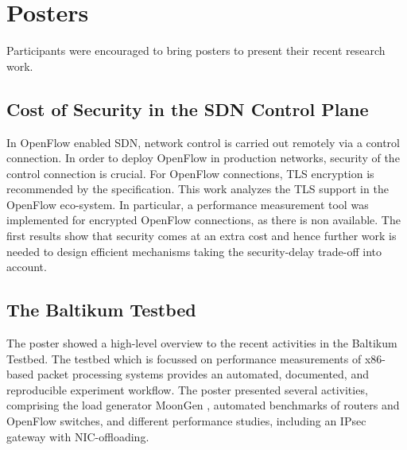 \section{Posters}\label{sec:posters}

Participants were encouraged to bring posters to present
their recent research work.

\subsection{Cost of Security in the SDN Control Plane}

In OpenFlow enabled \ac{SDN}, network control is carried out remotely via a
control connection. In order to deploy OpenFlow in production networks,
security of the control connection is crucial. For OpenFlow connections, TLS
encryption is recommended by the specification. This work
\cite{wkellerer:conext:2015} analyzes the TLS support in the OpenFlow
eco-system. In particular, a performance measurement tool was implemented for
encrypted OpenFlow connections, as there is non available. The first results
show that security comes at an extra cost and hence further work is needed to
design efficient mechanisms taking the security-delay trade-off into account.


\subsection{The Baltikum Testbed}

The poster showed a high-level overview to the recent activities
\cite{pemmerich:imc:2015, sgallenmuller:ancs:2015, draumer:cloudnet:2016,
draumer:anrw:2016} in the Baltikum Testbed. The testbed which is focussed on
performance measurements of x86-based packet processing systems provides an
automated, documented, and reproducible experiment workflow. The poster
presented several activities, comprising the load generator MoonGen
\cite{pemeerich:imc:2015}, automated benchmarks of routers and OpenFlow
switches, and different performance studies, including an IPsec gateway with
NIC-offloading.

